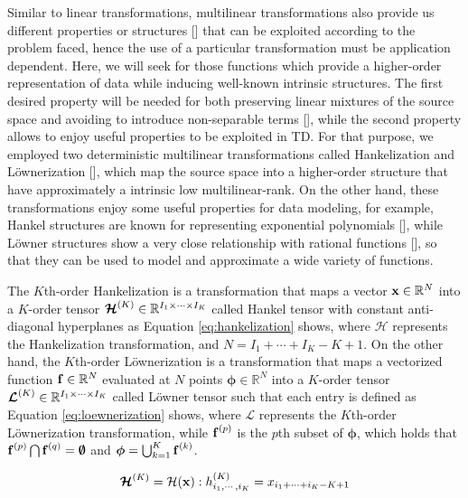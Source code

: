 \documentclass[sensors,article,submit,moreauthors,pdftex]{Definitions/mdpi}
\newcommand{\mathvec}[1]{\boldsymbol{\mathbf{\MakeLowercase{#1}}}}
\newcommand{\mathten}[1]{\boldsymbol{\mathbf{\mathcal{\MakeUppercase{#1}}}}}
\begin{document}
Similar to linear transformations, multilinear transformations also provide us different properties or structures [] that can be exploited according to the problem faced, hence the use of a particular transformation must be application dependent. Here, we will seek for those functions which provide a higher-order representation of data while inducing well-known intrinsic structures. The first desired property will be needed for both preserving linear mixtures of the source space and avoiding to introduce non-separable terms [], while the second property allows to enjoy useful properties to be exploited in TD. For that purpose, we employed two deterministic multilinear transformations called Hankelization and L{\"o}wnerization [], which map the source space into a higher-order structure that have approximately a intrinsic low multilinear-rank. On the other hand, these transformations enjoy some useful properties for data modeling, for example, Hankel structures are known for representing exponential polynomials [], while L{\"o}wner structures show a very close relationship with rational functions [], so that they can be used to model and approximate a wide variety of functions.

The $K$th-order Hankelization is a transformation that maps a vector $\mathvec{x}\in\mathbb{R}^N$ into a $K$-order tensor $\mathten{H}^{(K)} \in\mathbb{R}^{I_1 \times \cdots \times I_K}$ called Hankel tensor with constant anti-diagonal hyperplanes as Equation \ref{eq:hankelization} shows, where $\mathcal{H}$ represents the Hankelization transformation, and $N = I_1 + \cdots + I_K - K + 1$.  On the other hand, the $K$th-order L{\"o}wnerization is a transformation that maps a vectorized function $\mathvec{f}\in\mathbb{R}^N$ evaluated at $N$ points $\boldsymbol{\phi}\in\mathbb{R}^{N}$ into a $K$-order tensor $\mathten{L}^{(K)} \in \mathbb{R}^{I_1 \times \cdots \times I_K}$ called L{\"o}wner tensor such that each entry is defined as Equation \ref{eq:loewnerization} shows, where $\mathcal{L}$ represents the $K$th-order L{\"o}wnerization transformation, while $\mathvec{f}^{(p)}$ is the $p$th subset of $\boldsymbol{\phi}$, which holds that  $\mathvec{f}^{(p)} \bigcap \mathvec{f}^{(q)} = \boldsymbol{\emptyset}$ and $\boldsymbol{\phi}=\bigcup_{k=1}^{K} {\mathvec{f}^{(k)}}$.

\begin{equation}
\mathten{H}^{(K)} = \mathcal{H}(\mathvec{x}) :  h^{(K)}_{i_1,\cdots,i_K} = x_{i_1 + \cdots + i_K - K + 1} %
\label{eq:hankelization}
\end{equation}
\end{document}
